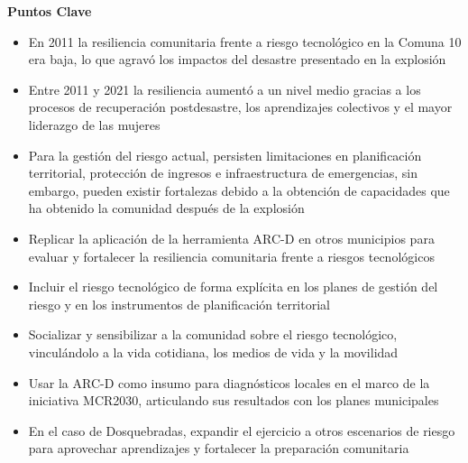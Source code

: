 \documentclass[
  letterpaper,
]{book}
\providecommand{\tightlist}{%
  \setlength{\itemsep}{0pt}\setlength{\parskip}{0pt}}
\begin{document}
\begin{tcolorbox}[enhanced jigsaw, arc=.35mm, colback=white, opacityback=0, colframe=quarto-callout-important-color-frame, left=2mm, toprule=.15mm, rightrule=.15mm, breakable, leftrule=.75mm, bottomrule=.15mm]

\vspace{-3mm}\textbf{Puntos Clave}\vspace{3mm}

\begin{itemize}
\tightlist
\item
  En 2011 la resiliencia comunitaria frente a riesgo tecnológico en la
  Comuna 10 era baja, lo que agravó los impactos del desastre presentado
  en la explosión
\item
  Entre 2011 y 2021 la resiliencia aumentó a un nivel medio gracias a
  los procesos de recuperación postdesastre, los aprendizajes colectivos
  y el mayor liderazgo de las mujeres
\item
  Para la gestión del riesgo actual, persisten limitaciones en
  planificación territorial, protección de ingresos e infraestructura de
  emergencias, sin embargo, pueden existir fortalezas debido a la
  obtención de capacidades que ha obtenido la comunidad después de la
  explosión
\end{itemize}

\end{tcolorbox}

\begin{tcolorbox}[enhanced jigsaw, colback=white, opacityback=0, bottomtitle=1mm, toprule=.15mm, colbacktitle=quarto-callout-tip-color!10!white, titlerule=0mm, toptitle=1mm, breakable, leftrule=.75mm, coltitle=black, arc=.35mm, opacitybacktitle=0.6, colframe=quarto-callout-tip-color-frame, left=2mm, title=\textcolor{quarto-callout-tip-color}{\faLightbulb}\hspace{0.5em}{Recomendaciones para Tomar Decisiones}, bottomrule=.15mm, rightrule=.15mm]

\begin{itemize}
\tightlist
\item
  Replicar la aplicación de la herramienta ARC-D en otros municipios
  para evaluar y fortalecer la resiliencia comunitaria frente a riesgos
  tecnológicos
\item
  Incluir el riesgo tecnológico de forma explícita en los planes de
  gestión del riesgo y en los instrumentos de planificación territorial
\item
  Socializar y sensibilizar a la comunidad sobre el riesgo tecnológico,
  vinculándolo a la vida cotidiana, los medios de vida y la movilidad
\item
  Usar la ARC-D como insumo para diagnósticos locales en el marco de la
  iniciativa MCR2030, articulando sus resultados con los planes
  municipales
\item
  En el caso de Dosquebradas, expandir el ejercicio a otros escenarios
  de riesgo para aprovechar aprendizajes y fortalecer la preparación
  comunitaria
\end{itemize}

\end{tcolorbox}
\end{document}
